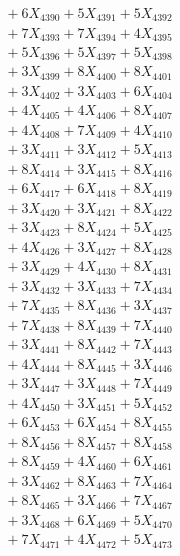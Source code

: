 \documentclass[a4paper,10pt]{article}
\begin{document}
{\begin{align}
&\;  + 6 X_{4390} + 5 X_{4391} + 5 X_{4392} \\[0.3ex]
&\;  + 7 X_{4393} + 7 X_{4394} + 4 X_{4395} \\[0.3ex]
&\;  + 5 X_{4396} + 5 X_{4397} + 5 X_{4398} \\[0.3ex]
&\;  + 3 X_{4399} + 8 X_{4400} + 8 X_{4401} \\[0.3ex]
&\;  + 3 X_{4402} + 3 X_{4403} + 6 X_{4404} \\[0.3ex]
&\;  + 4 X_{4405} + 4 X_{4406} + 8 X_{4407} \\[0.3ex]
&\;  + 4 X_{4408} + 7 X_{4409} + 4 X_{4410} \\[0.3ex]
&\;  + 3 X_{4411} + 3 X_{4412} + 5 X_{4413} \\[0.3ex]
&\;  + 8 X_{4414} + 3 X_{4415} + 8 X_{4416} \\[0.3ex]
&\;  + 6 X_{4417} + 6 X_{4418} + 8 X_{4419} \\[0.5ex]\allowbreak
&\;  + 3 X_{4420} + 3 X_{4421} + 8 X_{4422} \\[0.3ex]
&\;  + 3 X_{4423} + 8 X_{4424} + 5 X_{4425} \\[0.3ex]
&\;  + 4 X_{4426} + 3 X_{4427} + 8 X_{4428} \\[0.3ex]
&\;  + 3 X_{4429} + 4 X_{4430} + 8 X_{4431} \\[0.3ex]
&\;  + 3 X_{4432} + 3 X_{4433} + 7 X_{4434} \\[0.3ex]
&\;  + 7 X_{4435} + 8 X_{4436} + 3 X_{4437} \\[0.3ex]
&\;  + 7 X_{4438} + 8 X_{4439} + 7 X_{4440} \\[0.3ex]
&\;  + 3 X_{4441} + 8 X_{4442} + 7 X_{4443} \\[0.3ex]
&\;  + 4 X_{4444} + 8 X_{4445} + 3 X_{4446} \\[0.3ex]
&\;  + 3 X_{4447} + 3 X_{4448} + 7 X_{4449} \\[0.5ex]\allowbreak
&\;  + 4 X_{4450} + 3 X_{4451} + 5 X_{4452} \\[0.3ex]
&\;  + 6 X_{4453} + 6 X_{4454} + 8 X_{4455} \\[0.3ex]
&\;  + 8 X_{4456} + 8 X_{4457} + 8 X_{4458} \\[0.3ex]
&\;  + 8 X_{4459} + 4 X_{4460} + 6 X_{4461} \\[0.3ex]
&\;  + 3 X_{4462} + 8 X_{4463} + 7 X_{4464} \\[0.3ex]
&\;  + 8 X_{4465} + 3 X_{4466} + 7 X_{4467} \\[0.3ex]
&\;  + 3 X_{4468} + 6 X_{4469} + 5 X_{4470} \\[0.3ex]
&\;  + 7 X_{4471} + 4 X_{4472} + 5 X_{4473} \\[0.3ex]

\end{align}}
\end{document}
